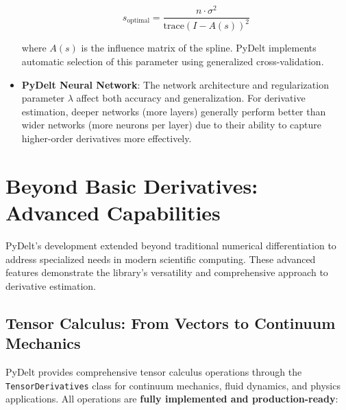 \documentclass[10pt,journal,compsoc]{IEEEtran}
\begin{document}
\begin{itemize}
    \begin{equation}
        s_{\text{optimal}} = \frac{n \cdot \sigma^2}{\text{trace}(I - A(s))^2}
    \end{equation}
    
    where $A(s)$ is the influence matrix of the spline. PyDelt implements automatic selection of this parameter using generalized cross-validation.
    
    \item \textbf{PyDelt Neural Network}: The network architecture and regularization parameter $\lambda$ affect both accuracy and generalization. For derivative estimation, deeper networks (more layers) generally perform better than wider networks (more neurons per layer) due to their ability to capture higher-order derivatives more effectively.
\end{itemize}

\section{Beyond Basic Derivatives: Advanced Capabilities}

PyDelt's development extended beyond traditional numerical differentiation to address specialized needs in modern scientific computing. These advanced features demonstrate the library's versatility and comprehensive approach to derivative estimation.

\subsection{Tensor Calculus: From Vectors to Continuum Mechanics}

PyDelt provides comprehensive tensor calculus operations through the \texttt{TensorDerivatives} class for continuum mechanics, fluid dynamics, and physics applications. All operations are \textbf{fully implemented and production-ready}:
\end{document}
